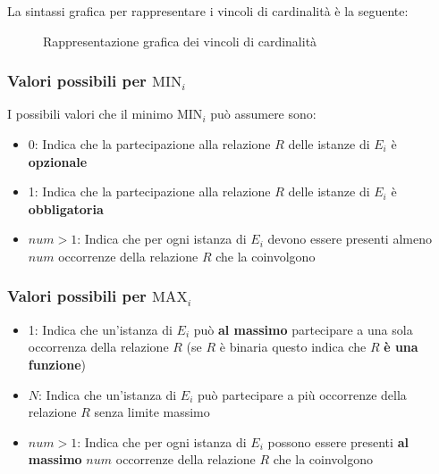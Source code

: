 \documentclass[a4paper]{article}
\begin{document}
\vspace{1em}
\noindent
La sintassi grafica per rappresentare i vincoli di cardinalità è la seguente:
\begin{figure}[H]
  \centering
  \caption{Rappresentazione grafica dei vincoli di cardinalità}
\end{figure}

\subsubsection{Valori possibili per \texorpdfstring{\( \text{MIN}_i \)}{MIN\_i}}
I possibili valori che il minimo \( \text{MIN}_i \) può assumere sono:
\begin{itemize}
  \item 0: Indica che la partecipazione alla relazione \( R \) delle istanze di \( E_i \)
    è \textbf{opzionale}

  \item 1: Indica che la partecipazione alla relazione \( R \) delle istanze di \( E_i \)
    è \textbf{obbligatoria}

  \item \( num > 1 \): Indica che per ogni istanza di \( E_i \) devono essere presenti
    almeno \( num \) occorrenze della relazione \( R \) che la coinvolgono
\end{itemize}

\subsubsection{Valori possibili per \texorpdfstring{\( \text{MAX}_i \)}{MAX\_i}}
\begin{itemize}
  \item 1: Indica che un'istanza di \( E_i \) può \textbf{al massimo} partecipare a una
    sola occorrenza della relazione \( R \) (se \( R \) è binaria questo indica che \( R \)
    \textbf{è una funzione})

  \item \( N \): Indica che un'istanza di \( E_i \) può partecipare a più occorrenze
    della relazione \( R \) senza limite massimo

  \item \( num > 1 \): Indica che per ogni istanza di \( E_i \) possono essere presenti
    \textbf{al massimo} \( num \) occorrenze della relazione \( R \) che la coinvolgono
\end{itemize}
\end{document}
